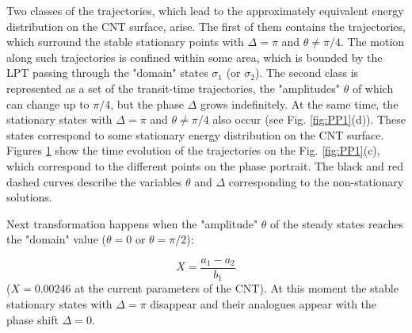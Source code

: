 \begin{figure}
\label{fig:angles000186}
\end{figure}

Two classes of the trajectories, which lead to the approximately equivalent energy distribution on the CNT surface, arise.
The first of them contains the trajectories, which surround the stable stationary points with $\Delta=\pi$ and $\theta \ne \pi/4$.
The motion along such trajectories is confined within some area, which is bounded by the LPT passing through the "domain" states $\sigma_{1}$ (or $\sigma_{2}$).
The second class is represented as a set of the transit-time trajectories, the "amplitudes" $\theta$ of which can change up to $\pi/4$, but the phase $\Delta$ grows indefinitely.
At the same time, the stationary states with $\Delta =\pi$ and $\theta \ne \pi/4$ also occur (see Fig. \ref{fig:PP1}(d)).
These states correspond to some stationary energy distribution on the CNT surface.
Figures \ref{fig:angles000186} show the time evolution of the trajectories on the Fig. \ref{fig:PP1}(c), which correspond to the different points on the phase portrait.
The black and red dashed curves describe the variables $\theta$ and $\Delta$ corresponding to the non-stationary solutions.

Next transformation happens when the "amplitude" $\theta$ of the steady states reaches the "domain" value ($\theta=0$ or $\theta=\pi/2$):

\begin{equation}
X=\frac{a_{1}-a_{2}}{b_{1}}
\end{equation}
($X=0.00246$ at the current parameters of the CNT).
At this moment the stable stationary states with $\Delta=\pi$ disappear and their analogues appear with the phase shift $\Delta=0$.


